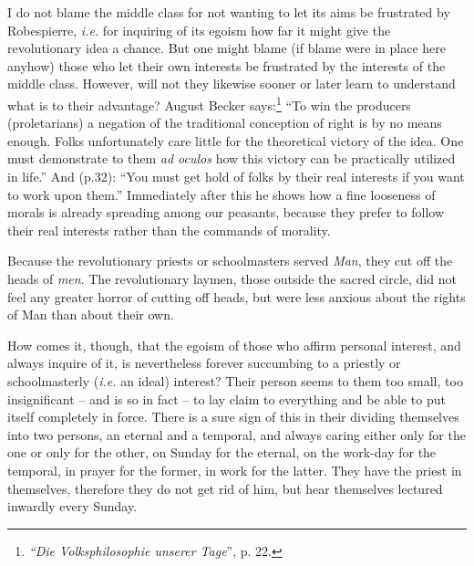 I do not blame the middle class for not wanting to let its aims be frustrated 
by Robespierre, \textit{i.e.} for inquiring of its egoism how far it might 
give the revolutionary idea a chance. But one might blame (if blame were in 
place here anyhow) those who let their own interests be frustrated by the 
interests of the middle class. However, will not they likewise sooner or later 
learn to understand what is to their advantage? August Becker 
says:\footnote{\textit{``Die Volksphilosophie unserer Tage}'', p. 22.} ``To 
win the producers (proletarians) a negation of the traditional conception of 
right is by no means enough. Folks unfortunately care little for the 
theoretical victory of the idea. One must demonstrate to them \textit{ad 
oculos} how this victory can be practically utilized in life.'' And (p.32): 
``You must get hold of folks by their real interests if you want to work upon 
them.'' Immediately after this he shows how a fine looseness of morals is 
already spreading among our peasants, because they prefer to follow their real 
interests rather than the commands of morality.

Because the revolutionary priests or schoolmasters served \textit{Man}, they 
cut off the heads of \textit{men}. The revolutionary laymen, those outside the 
sacred circle, did not feel any greater horror of cutting off heads, but were 
less anxious about the rights of Man than about their own.

How comes it, though, that the egoism of those who affirm personal interest, 
and always inquire of it, is nevertheless forever succumbing to a priestly or 
schoolmasterly (\textit{i.e.} an ideal) interest? Their person seems to them 
too small, too insignificant -- and is so in fact -- to lay claim to 
everything and be able to put itself completely in force. There is a sure sign 
of this in their dividing themselves into two persons, an eternal and a 
temporal, and always caring either only for the one or only for the other, on 
Sunday for the eternal, on the work-day for the temporal, in prayer for the 
former, in work for the latter. They have the priest in themselves, therefore 
they do not get rid of him, but hear themselves lectured inwardly every 
Sunday.

